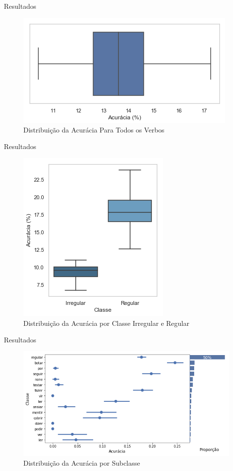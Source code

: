 \begin{frame}{Resultados}

\begin{figure}[H]
  \centering
  \includegraphics[width=0.6\linewidth]{images/results/mean_accuracy.png}
  \caption{Distribuição da Acurácia Para Todos os Verbos}
  \label{fig:acc}
\end{figure}

\end{frame}

\begin{frame}{Resultados}

\begin{figure}[H]
  \centering
  \includegraphics[width=0.4\linewidth]{images/results/boxplot_irregular_vs_regular.png}
  \caption{Distribuição da Acurácia por Classe Irregular e Regular}
  \label{fig:acc}
\end{figure}

\end{frame}

\begin{frame}{Resultados}

\begin{figure}[H]
  \centering
  \includegraphics[width=0.9\linewidth]{images/results/proporxacc.png}
  \caption{Distribuição da Acurácia por Subclasse}
  \label{fig:acc}
\end{figure}

\end{frame}